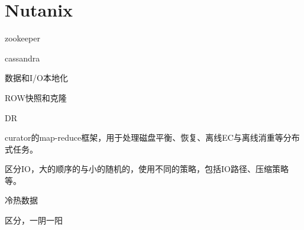 \chapter{Nutanix}

zookeeper

cassandra

数据和I/O本地化

ROW快照和克隆

DR

curator的map-reduce框架，用于处理磁盘平衡、恢复、离线EC与离线消重等分布式任务。

区分IO，大的顺序的与小的随机的，使用不同的策略，包括IO路径、压缩策略等。

冷热数据

区分，一阴一阳
